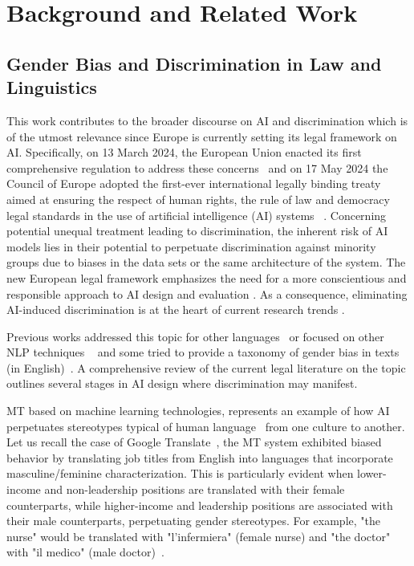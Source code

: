 \section{Background and Related Work}
\label{s:rw}
\subsection{Gender Bias and Discrimination in Law and Linguistics}
This work contributes to the broader discourse on AI and discrimination which is of the utmost relevance since Europe is currently setting its legal framework on AI. Specifically, on 13 March 2024, the European Union enacted its first comprehensive regulation to address these concerns~\cite{EU2024} and on 17 May 2024 the Council of Europe adopted the first-ever international legally binding treaty aimed at ensuring the respect of human rights, the rule of law and democracy legal standards in the use of artificial intelligence (AI) systems ~\cite{CouncilofEurope2024}. Concerning potential unequal treatment leading to discrimination, the inherent risk of AI models lies in their potential to perpetuate discrimination against minority groups due to biases in the data sets or the same architecture of the system. The new European legal framework emphasizes the need for a more conscientious and responsible approach to AI design and evaluation \cite{Nardocci2021}. As a consequence, eliminating AI-induced discrimination is at the heart of current research trends \cite{maghool2023enhancing}. 

Previous works addressed this topic for other languages~\cite{bolukbasi2016man} or focused on other NLP techniques ~\cite{park2018reducing,bolukbasi2016quantifying,may2019measuring} and some tried to provide a taxonomy of gender bias in texts (in English)~\cite{doughman-etal-2021-gender}. A comprehensive review of the current legal literature on the topic \cite{Nardocci2021} outlines several stages in AI design where discrimination may manifest. 

MT based on machine learning technologies, represents an example of how AI perpetuates stereotypes typical of human language~\cite{DAmico2023} from one culture to another. Let us recall the case of Google Translate~\cite{Prates2018}, the MT system exhibited biased behavior by translating job titles from English into languages that incorporate masculine/feminine characterization. This is particularly evident when lower-income and non-leadership positions are translated with their female counterparts, while higher-income and leadership positions are associated with their male counterparts, perpetuating gender stereotypes. For example, "the nurse" would be translated with "l'infermiera" (female nurse) and "the doctor" with "il medico" (male doctor)~\cite{AdamsLoideain2019,Prates2018}.

